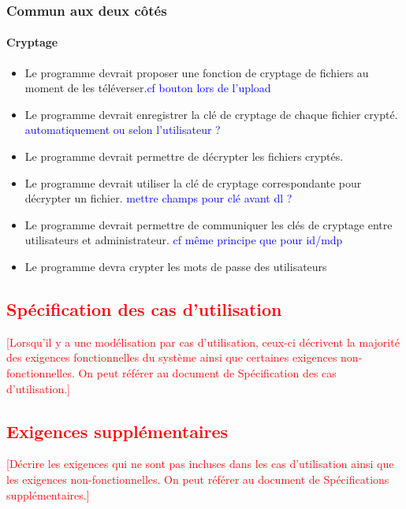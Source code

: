 \documentclass[10pt,a4paper]{report}
\begin{document}
\subsubsection{Commun aux deux côtés}
\paragraph{Cryptage}
	\begin{itemize}[label = $\triangleright$]
		\item Le programme devrait proposer une fonction de cryptage de fichiers au moment de les téléverser.\textcolor{blue}{cf bouton lors de l'upload}
		\item Le programme devrait enregistrer la clé de cryptage de chaque fichier crypté. \textcolor{blue}{automatiquement ou selon l'utilisateur ?}
		\item Le programme devrait permettre de décrypter les fichiers cryptés.
		\item Le programme devrait utiliser la clé de cryptage correspondante pour décrypter un fichier. \textcolor{blue}{mettre champs pour clé avant dl ?}
		\item Le programme devrait permettre de communiquer les clés de cryptage entre utilisateurs et administrateur. \textcolor{blue}{cf même principe que pour id/mdp}
		\item Le programme devra crypter les mots de passe des utilisateurs
	\end{itemize}

\textcolor{red}{\subsection{Spécification des cas d’utilisation}
[Lorsqu’il y a une modélisation par cas d’utilisation, ceux-ci décrivent la majorité des exigences fonctionnelles du système ainsi que certaines exigences non-fonctionnelles. On peut référer au document de Spécification des cas d’utilisation.]}

\textcolor{red}{\subsection{Exigences supplémentaires}
[Décrire les exigences qui ne sont pas incluses dans les cas d’utilisation ainsi que les exigences non-fonctionnelles. On peut référer au document de Spécifications supplémentaires.]}
\end{document}
